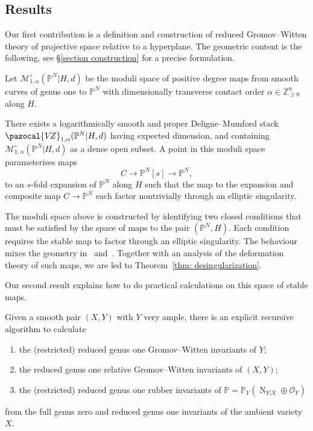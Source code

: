 \documentclass[11pt]{amsart}
\newcommand{\PP}{\mathbb P}
\newcommand{\VZ}{\pazocal{V\!Z}}
\newcommand{\OO}{\mathcal{O}}
\renewcommand{\to}{\rightarrow}
\theoremstyle{definition}
\newenvironment{customthm}[1]
  {\renewcommand\theinnercustomthm{#1}\innercustomthm}
  {\endinnercustomthm}
\theoremstyle{definition}
\begin{document}
\subsection{Results} Our first contribution is a definition and construction of reduced Gromov--Witten theory of projective space relative to a hyperplane. The geometric content is the following, see \S \ref{section construction} for a precise formulation.

Let $\mathcal M_{1,\alpha}^\circ(\mathbb P^N|H,d)$ be the moduli space of positive degree maps from smooth curves of genus one to $\mathbb P^N$ with dimensionally transverse contact order $\alpha\in\mathbb Z^n_{\geq 0}$ along $H$. 

\begin{customthm}{A}\label{thm: desingularization}
There exists a logarithmically smooth and proper Deligne--Mumford stack $\VZ_{1,\alpha}(\mathbb P^N|H,d)$ having expected dimension, and containing $\mathcal M_{1,\alpha}^\circ(\mathbb P^N|H,d)$  as a dense open subset. A point in this moduli space parameterises maps
\[
C\to \mathbb P^N[s]\to \mathbb P^N,
\]
to an $s$-fold expansion of $\mathbb P^N$ along $H$ such that the map to the expansion and composite map $C\to \mathbb P^N$ each factor nontrivially through an elliptic singularity. 
\end{customthm}

The moduli space above is constructed by identifying two closed conditions that must be satisfied by the space of maps to the pair $(\mathbb P^N,H)$. Each condition requires the stable map to factor through an elliptic singularity. The behaviour mixes the geometry in~\cite{RSPW} and~\cite{RSPW2}. {Together with an analysis of the deformation theory of such maps, we are led to Theorem~\ref{thm: desingularization}}.

Our second result explains how to do practical calculations on this space of stable maps. 

\begin{customthm}{B}\label{thm: recursion}
Given a smooth pair $(X,Y)$ with $Y$ very ample, there is an explicit recursive algorithm to calculate
\begin{enumerate}
\item the (restricted) reduced genus one Gromov--Witten invariants of $Y$;
\item the reduced genus one relative Gromov--Witten invariants of $(X,Y)$; 
\item the (restricted) reduced genus one rubber invariants of $\mathbb{P}=\PP_Y(\operatorname{N}_{Y|X} \oplus \OO_Y)$
\end{enumerate}
from the full genus zero and reduced genus one invariants of the ambient variety $X$.
\end{customthm}
\end{document}
